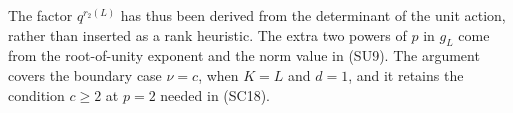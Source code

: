 The factor $q^{r_2(L)}$ has thus been derived from the
determinant of the unit action, rather than inserted as
a rank heuristic.  The extra two powers of $p$ in $g_L$
come from the root-of-unity exponent and the norm value
in (SU9).  The argument covers the boundary case
$\nu=c$, when $K=L$ and $d=1$, and it retains the
condition $c\ge2$ at $p=2$ needed in (SC18).


